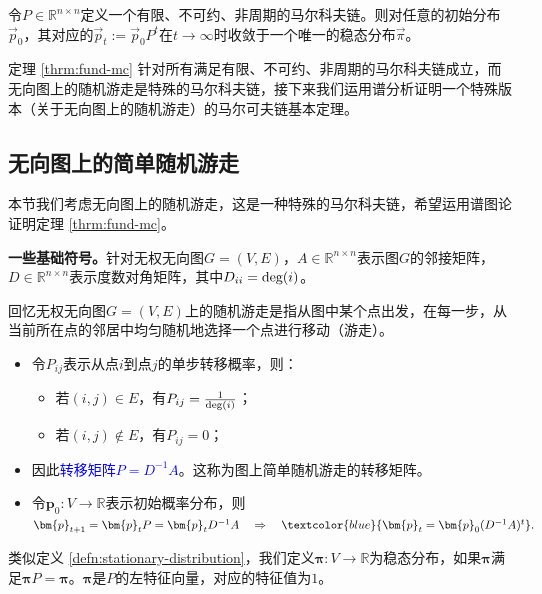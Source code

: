     \begin{theorem}[马尔科夫链基本定理] 
        \label{thrm:fund-mc}
        令$P\in \mathbb{R}^{n\times n}$定义一个有限、不可约、非周期的马尔科夫链。则对任意的初始分布$\vec{p}_0$，其对应的$\vec{p}_t:=\vec{p}_0P^t$在$t\rightarrow \infty$时收敛于一个唯一的稳态分布$\vec{\pi}$。
    \end{theorem}

    定理 \ref{thrm:fund-mc} 针对所有满足有限、不可约、非周期的马尔科夫链成立，而无向图上的随机游走是特殊的马尔科夫链，接下来我们运用谱分析证明一个特殊版本（关于无向图上的随机游走）的马尔可夫链基本定理。


        
\subsection{无向图上的简单随机游走}
        
本节我们考虑无向图上的随机游走，这是一种特殊的马尔科夫链，希望运用谱图论证明定理 \ref{thrm:fund-mc}。

\textbf{一些基础符号。}针对无权无向图$G=(V,E)$，$A\in\mathbb{R}^{n\times n}$表示图$G$的邻接矩阵，$D\in\mathbb{R}^{n\times n}$表示度数对角矩阵，其中$D_{ii}=\textup{deg}(i)$。

\vspace{0.2cm}
回忆无权无向图$G=(V,E)$上的随机游走是指从图中某个点出发，在每一步，从当前所在点的邻居中均匀随机地选择一个点进行移动（游走）。
        
\begin{itemize}
    \item 令$P_{ij}$表示从点$i$到点$j$的单步转移概率，则：
    \begin{itemize}
        \item 若$(i,j)\in E$，有$P_{ij}=\frac{1}{\textup{deg}(i)}$；
        \item 若$(i,j)\notin E$，有$P_{ij}=0$；
    \end{itemize}
    \item 因此\textcolor{blue}{转移矩阵$P=D^{-1}A$}。这称为图上简单随机游走的转移矩阵。
    \item 令$\bm{p}_0:V\rightarrow \mathbb{R}$表示初始概率分布，则$\bm{p}_{t+1} = \bm{p}_t P= \bm{p}_t D^{-1}A
        \quad \Rightarrow \quad
        \textcolor{blue}{\bm{p}_t = \bm{p}_0 (D^{-1}A)^t}.$
\end{itemize}

\vspace{0.2cm}
类似定义 \ref{defn:stationary-distribution}，我们定义$\bm{\pi}:V\to \mathbb{R}$为稳态分布，如果$\bm{\pi}$满足$\bm{\pi}P=\bm{\pi}$。$\bm{\pi}$是$P$的左特征向量，对应的特征值为$1$。%

